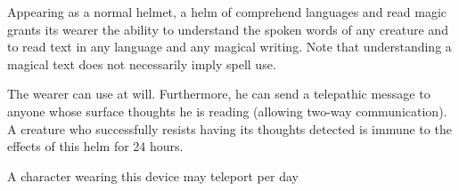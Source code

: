 \begin{comment}
Once all its jewels have lost their magic, the helm loses its powers and the gems turn to worthless powder. Removing a jewel destroys it.

If a creature wearing the helm is damaged by magical fire (after the fire protection is taken into account) and fails an additional DR 15 Will save, the remaining gems on the helm overload and detonate. Remaining diamonds become prismatic sprays that each randomly target a creature within range (possibly the wearer), rubies become straight-line walls of fire extending outward in a random direction from the helm wearer, and fire opals become fireballs centered on the helm wearer. The opals and the helm itself are destroyed.

Strong varied; CL 13th; Craft Wondrous Item, detect undead, fireball, flame blade, light, prismatic spray, protection from energy, wall of fire; Price 125,000 gp;Weight 3 lb.
\end{comment}

 Appearing as a normal helmet, a helm of comprehend languages and read magic grants its wearer the ability to understand the spoken words of any creature and to read text in any language and any magical writing. Note that understanding a magical text does not necessarily imply spell use.

 The wearer can use  at will. Furthermore, he can send a telepathic message to anyone whose surface thoughts he is reading (allowing two-way communication). A creature who successfully resists having its thoughts detected is immune to the effects of this helm for 24 hours.

 A character wearing this device may teleport  per day 


